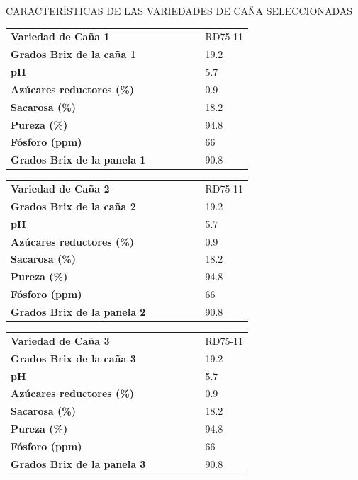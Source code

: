 \documentclass{article}%
\begin{document}
\newpage%
\begin{center}%
\begin{Huge}%
CARACTERÍSTICAS DE LAS VARIEDADES DE CAÑA SELECCIONADAS%
\end{Huge}%
\linebreak%
\end{center}%
\begin{tabular}{lcccccl}%
\textbf{Variedad de Caña 1}& & & & & &RD75{-}11\\%
\textbf{Grados Brix de la caña 1}& & & & & &19.2\\%
\textbf{pH}& & & & & &5.7\\%
\textbf{Azúcares reductores (\%)}& & & & & &0.9\\%
\textbf{Sacarosa (\%)}& & & & & &18.2\\%
\textbf{Pureza (\%)}& & & & & &94.8\\%
\textbf{Fósforo (ppm)}& & & & & &66\\%
\textbf{Grados Brix de la panela 1}& & & & & &90.8\\%
\end{tabular}%
\linebreak%
\newline%
%
\linebreak%
\begin{tabular}{lcccccl}%
\textbf{Variedad de Caña 2}& & & & & &RD75{-}11\\%
\textbf{Grados Brix de la caña 2}& & & & & &19.2\\%
\textbf{pH}& & & & & &5.7\\%
\textbf{Azúcares reductores (\%)}& & & & & &0.9\\%
\textbf{Sacarosa (\%)}& & & & & &18.2\\%
\textbf{Pureza (\%)}& & & & & &94.8\\%
\textbf{Fósforo (ppm)}& & & & & &66\\%
\textbf{Grados Brix de la panela 2}& & & & & &90.8\\%
\end{tabular}%
\linebreak%
\newline%
%
\linebreak%
\begin{tabular}{lcccccl}%
\textbf{Variedad de Caña 3}& & & & & &RD75{-}11\\%
\textbf{Grados Brix de la caña 3}& & & & & &19.2\\%
\textbf{pH}& & & & & &5.7\\%
\textbf{Azúcares reductores (\%)}& & & & & &0.9\\%
\textbf{Sacarosa (\%)}& & & & & &18.2\\%
\textbf{Pureza (\%)}& & & & & &94.8\\%
\textbf{Fósforo (ppm)}& & & & & &66\\%
\textbf{Grados Brix de la panela 3}& & & & & &90.8\\%
\end{tabular}%
\end{document}
